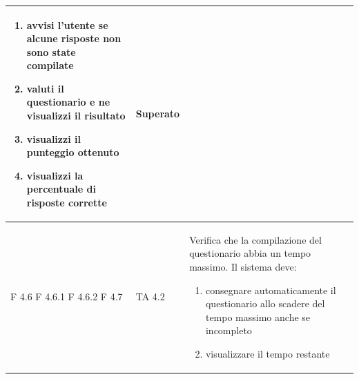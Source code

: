 \documentclass[a4paper,11pt]{article}
\begin{document}
\begin{longtable}{p{}p{}p{}p{}}
\begin{enumerate}
\item avvisi l'utente se alcune risposte non sono state compilate
\item valuti il questionario e ne visualizzi il risultato
\item visualizzi il punteggio ottenuto
\item visualizzi la percentuale di risposte corrette 
\end{enumerate} & Superato\\
\midrule

F 4.6 \newline F 4.6.1 \newline F 4.6.2 \newline F 4.7& TA 4.2&Verifica che la compilazione del questionario abbia un tempo massimo. \newline
Il sistema deve:
\begin{enumerate}
\item consegnare automaticamente il questionario allo scadere del tempo massimo anche se incompleto
\item visualizzare il tempo restante


\end{enumerate}
\end{longtable}
\end{document}

